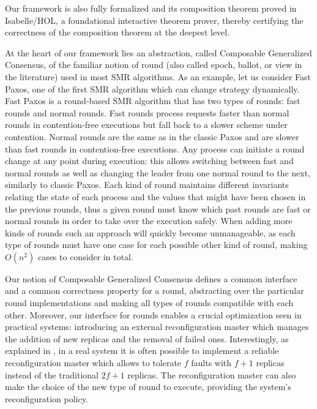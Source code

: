 Our framework is also fully formalized and its composition theorem proved in Isabelle/HOL, a foundational interactive theorem prover, thereby certifying the correctness of the composition theorem at the deepest level.

At the heart of our framework lies an abstraction, called Composable Generalized Consensus, of the familiar notion of round (also called epoch, ballot, or view in the literature) used in most SMR algorithms. As an example, let us consider Fast Paxos, one of the first SMR algorithm which can change strategy dynamically.
Fast Paxos is a round-based SMR algorithm that has two types of rounds: fast rounds and normal rounds. Fast rounds process requests faster than normal rounds in contention-free executions but fall back to a slower scheme under contention. Normal rounds are the same as in the classic Paxos and are slower than fast rounds in contention-free executions. Any process can initiate a round change at any point during execution: this allows switching between fast and normal rounds as well as changing the
leader from one normal round to the next, similarly to classic Paxos. Each kind of round maintains different invariants relating the state of each process and the values that might have been chosen in the previous rounds, thus a given round must know which past rounds are fast or normal rounds in order to take over the execution safely. When adding more kinds of rounds such an approach will quickly become unmanageable, as each type of rounds must have one case for each possible other kind of
round, making $O(n^2)$ cases to consider in total.

Our notion of Composable Generalized Consensus defines a common interface and a common correctness property for a round, abstracting over the particular round implementations and making all types of rounds compatible with each other. 
Moreover, our interface for rounds enables a crucial optimization seen in practical systems: introducing an external reconfiguration master which manages the addition of new replicas and the removal of failed ones. Interestingly, as explained in \cite{LamportMalkhiZhou09VerticalPaxosPrimarybackupReplication}, in a real system it is often possible to implement a reliable reconfiguration master which allows to tolerate $f$ faults with $f+1$ replicas instead of the traditional $2f+1$ replicas.
The reconfiguration master can also make the choice of the new type of round to execute, providing the system's reconfiguration policy.
